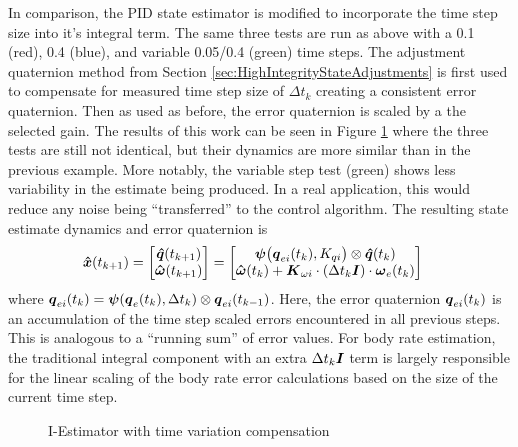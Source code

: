 In comparison, the PID state estimator is modified to incorporate the time step size into it's integral term.  The same three tests are run as above with a 0.1 (red), 0.4 (blue), and variable 0.05/0.4 (green) time steps.  The adjustment quaternion method from Section \ref{sec:HighIntegrityStateAdjustments} is first used to compensate for measured time step size of $\Delta t_{k}$ creating a consistent error quaternion.  Then as used as before, the error quaternion is scaled by a the selected gain.  The results of this work can be seen in Figure \ref{fig:IEstimatorwithtimevariationcompensation} where the three tests are still not identical, but their dynamics are more similar than in the previous example.  More notably, the variable step test (green) shows less variability in the estimate being produced.  In a real application, this would reduce any noise being ``transferred'' to the control algorithm.  The resulting state estimate dynamics and error quaternion is
\begin{equation}
  \begin{aligned}
    \boldsymbol{\hat{x}}(t_{k+1}) &= \begin{bmatrix} \boldsymbol{\hat{q}}(t_{k+1}) \\ \boldsymbol{\hat{\omega}}(t_{k+1}) \end{bmatrix} =
    \begin{bmatrix} \boldsymbol{\psi}\big(\boldsymbol{q}_{ei}(t_k), K_{qi}\big) \otimes \boldsymbol{\hat{q}}(t_{k}) \\
     \boldsymbol{\hat{\omega}}(t_{k}) + \boldsymbol{K}_{\omega i} \cdot (\Delta t_k \boldsymbol{I})\cdot \boldsymbol{\omega}_e(t_{k}) \end{bmatrix}
  \end{aligned}
  \label{eqn:IEstimator}
\end{equation}
where $\boldsymbol{q}_{ei}(t_k) = \boldsymbol{\psi}(\boldsymbol{q}_e(t_{k}), \Delta t_{k}) \otimes \boldsymbol{q}_{ei}(t_{k-1})$.  Here, the error quaternion $\boldsymbol{q}_{ei}(t_k)$ is an accumulation of the time step scaled errors encountered in all previous steps.  This is analogous to a ``running sum'' of error values.  For body rate estimation, the traditional integral component with an extra $\Delta t_k \boldsymbol{I}$ term is largely responsible for the linear scaling of the body rate error calculations based on the size of the current time step.

\begin{figure}[H]
  \centerline{}
  \caption{I-Estimator with time variation compensation}
  \label{fig:IEstimatorwithtimevariationcompensation}
\end{figure}

